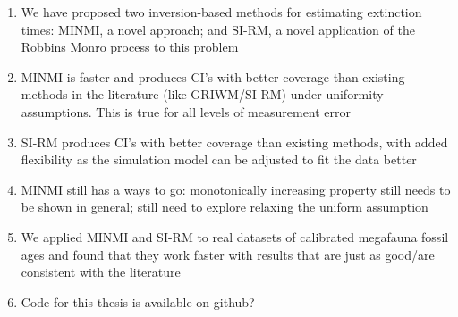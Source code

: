 
\begin{enumerate}
    \item We have proposed two inversion-based methods for estimating extinction times: MINMI, a novel approach; and SI-RM, a novel application of the Robbins Monro process to this problem
    \item MINMI is faster and produces CI's with better coverage than existing methods in the literature (like GRIWM/SI-RM) under uniformity assumptions. This is true for all levels of measurement error
    \item SI-RM produces CI's with better coverage than existing methods, with added flexibility as the simulation model can be adjusted to fit the data better
    \item MINMI still has a ways to go: monotonically increasing property still needs to be shown in general; still need to explore relaxing the uniform assumption
    \item We applied MINMI and SI-RM to real datasets of calibrated megafauna fossil ages and found that they work faster with results that are just as good/are consistent with the literature
    \item Code for this thesis is available on github?
\end{enumerate}